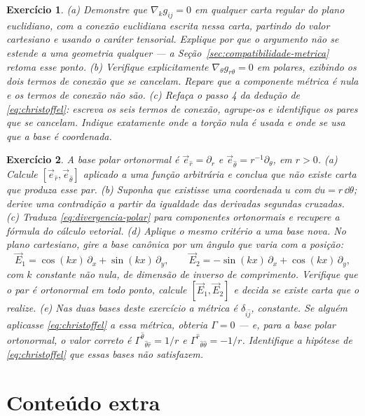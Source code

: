 \documentclass[12pt,a4paper,oneside]{book}
\theoremstyle{rgplain}
\newtheorem{exercise}{Exercício}[chapter]
\theoremstyle{rgremark}
\begin{document}
\begin{exercise}
(a) Demonstre que $\nabla_kg_{ij}=0$ em qualquer carta regular \emph{do plano
euclidiano}, com a conexão euclidiana escrita nessa carta, partindo do valor
cartesiano e usando o caráter tensorial. Explique por que o argumento não se
estende a uma geometria qualquer --- a Seção~\ref{sec:compatibilidade-metrica}
retoma esse ponto.
(b) Verifique explicitamente $\nabla_\theta g_{r\theta}=0$ em polares, exibindo
os dois termos de conexão que se cancelam. Repare que a componente métrica é
nula e os termos de conexão não são.
(c) Refaça o passo 4 da dedução de \eqref{eq:christoffel}: escreva os seis
termos de conexão, agrupe-os e identifique os pares que se cancelam. Indique
exatamente onde a torção nula é usada e onde se usa que a base é coordenada.
\end{exercise}

\begin{exercise}
A base polar ortonormal é $\vec e_{\hat r}=\partial_r$ e
$\vec e_{\hat\theta}=r^{-1}\partial_\theta$, em $r>0$.
(a) Calcule $[\vec e_{\hat r},\vec e_{\hat\theta}]$ aplicado a uma função
arbitrária e conclua que não existe carta que produza esse par.
(b) Suponha que existisse uma coordenada $u$ com $\dd u=r\,\dd\theta$; derive
uma contradição a partir da igualdade das derivadas segundas cruzadas.
(c) Traduza \eqref{eq:divergencia-polar} para componentes ortonormais e
recupere a fórmula do cálculo vetorial.
(d) Aplique o mesmo critério a uma base nova. No plano cartesiano, gire a
base canônica por um ângulo que varia com a posição:
\[
  \vec E_1=\cos(kx)\,\partial_x+\sin(kx)\,\partial_y ,
  \qquad
  \vec E_2=-\sin(kx)\,\partial_x+\cos(kx)\,\partial_y ,
\]
com $k$ constante não nula, de dimensão de inverso de comprimento. Verifique
que o par é ortonormal em todo ponto, calcule $[\vec E_1,\vec E_2]$ e decida se
existe carta que o realize.
(e) Nas duas bases deste exercício a métrica é $\delta_{\hat i\hat j}$,
constante. Se alguém aplicasse \eqref{eq:christoffel} a essa métrica, obteria
$\Gamma=0$ --- e, para a base polar ortonormal, o valor correto é
$\Gamma^{\hat\theta}{}_{\hat\theta\hat r}=1/r$ e
$\Gamma^{\hat r}{}_{\hat\theta\hat\theta}=-1/r$. Identifique a hipótese de
\eqref{eq:christoffel} que essas bases não satisfazem.
\end{exercise}


\section{Conteúdo extra}
\end{document}
